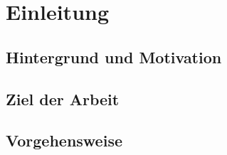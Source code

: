 \chapter{Einleitung}
\label{cha:einleitung}

\section{Hintergrund und Motivation}
\label{sec:motivation}

\section{Ziel der Arbeit}
\label{sec:goal}

\section{Vorgehensweise}
\label{sec:doing}

